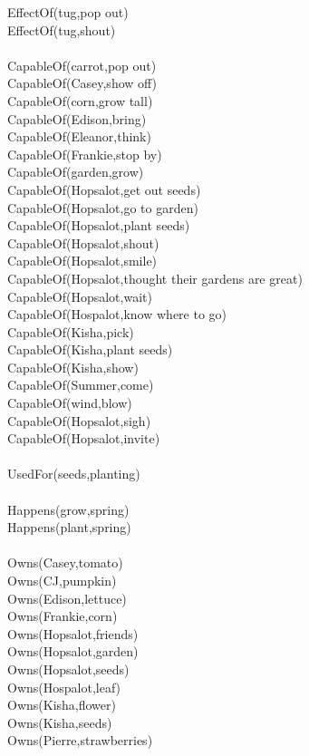 \begin{multicols}{2}
\begin{footnotesize}
EffectOf(tug,pop out) \\
EffectOf(tug,shout) \\
~\\
CapableOf(carrot,pop out) \\
CapableOf(Casey,show off) \\
CapableOf(corn,grow tall) \\
CapableOf(Edison,bring) \\
CapableOf(Eleanor,think) \\
CapableOf(Frankie,stop by) \\
CapableOf(garden,grow) \\
CapableOf(Hopsalot,get out seeds) \\
CapableOf(Hopsalot,go to garden) \\
CapableOf(Hopsalot,plant seeds) \\
CapableOf(Hopsalot,shout) \\
CapableOf(Hopsalot,smile) \\
CapableOf(Hopsalot,thought their gardens are great) \\
CapableOf(Hopsalot,wait) \\
CapableOf(Hospalot,know where to go) \\
CapableOf(Kisha,pick) \\
CapableOf(Kisha,plant seeds) \\
CapableOf(Kisha,show) \\
CapableOf(Summer,come) \\
CapableOf(wind,blow) \\
CapableOf(Hopsalot,sigh) \\
CapableOf(Hopsalot,invite) \\
~\\
UsedFor(seeds,planting) \\
~\\
Happens(grow,spring) \\
Happens(plant,spring) \\
~\\
Owns(Casey,tomato) \\
Owns(CJ,pumpkin) \\
Owns(Edison,lettuce) \\
Owns(Frankie,corn) \\
Owns(Hopsalot,friends) \\
Owns(Hopsalot,garden) \\
Owns(Hopsalot,seeds) \\
Owns(Hospalot,leaf) \\
Owns(Kisha,flower) \\
Owns(Kisha,seeds) \\
Owns(Pierre,strawberries) \\
\end{footnotesize}
\end{multicols}


